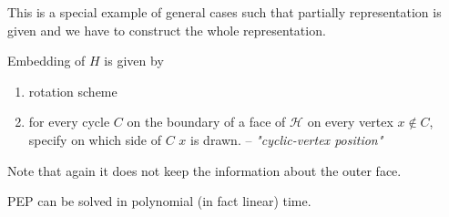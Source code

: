 \begin{rem}
	This is a special example of general cases such that partially representation is given and we have to construct the whole representation.
\end{rem}

\begin{note}
	Embedding of $H$ is given by
	
	\begin{enumerate}
		\item rotation scheme
		\item for every cycle $C$ on the boundary of a face of $\mathcal{H}$ on every vertex $x \notin C$, specify on which side of $C$ $x$ is drawn. -- \textit{"cyclic-vertex position"}
	\end{enumerate}

	Note that again it does not keep the information about the outer face.
\end{note}

\begin{thm}
	PEP can be solved in polynomial (in fact linear) time.
\end{thm}

